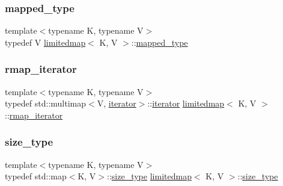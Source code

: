\subsubsection{\texorpdfstring{mapped\+\_\+type}{mapped\_type}}
{\footnotesize\ttfamily template$<$typename K, typename V$>$ \\
typedef V \mbox{\hyperlink{classlimitedmap}{limitedmap}}$<$ K, V $>$\+::\mbox{\hyperlink{classlimitedmap_a8bd6b8e7f91f0a141c91c382b492c03c}{mapped\+\_\+type}}}

\mbox{\label{classlimitedmap_ad3d926b1f365d819073ddaed8daa4400}} 
\subsubsection{\texorpdfstring{rmap\+\_\+iterator}{rmap\_iterator}}
{\footnotesize\ttfamily template$<$typename K, typename V$>$ \\
typedef std\+::multimap$<$V, \mbox{\hyperlink{classlimitedmap_aea661213ab6f699e9667bea25bf99821}{iterator}}$>$\+::\mbox{\hyperlink{classlimitedmap_aea661213ab6f699e9667bea25bf99821}{iterator}} \mbox{\hyperlink{classlimitedmap}{limitedmap}}$<$ K, V $>$\+::\mbox{\hyperlink{classlimitedmap_ad3d926b1f365d819073ddaed8daa4400}{rmap\+\_\+iterator}}\hspace{0.3cm}{\ttfamily [protected]}}

\mbox{\label{classlimitedmap_a1c564b323f94e182e56aa27975e5f9d1}} 
\subsubsection{\texorpdfstring{size\+\_\+type}{size\_type}}
{\footnotesize\ttfamily template$<$typename K, typename V$>$ \\
typedef std\+::map$<$K, V$>$\+::\mbox{\hyperlink{classlimitedmap_a1c564b323f94e182e56aa27975e5f9d1}{size\+\_\+type}} \mbox{\hyperlink{classlimitedmap}{limitedmap}}$<$ K, V $>$\+::\mbox{\hyperlink{classlimitedmap_a1c564b323f94e182e56aa27975e5f9d1}{size\+\_\+type}}}

\mbox{\label{classlimitedmap_a8a6c4972e628b71bf43eeb757dafdce5}} 
